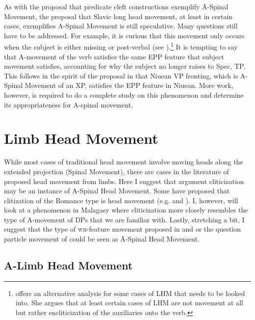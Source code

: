 \documentclass[output=paper,colorlinks,citecolor=brown,
]{langscibook}
\begin{document}
\ea
    \z
\z

As with the proposal that predicate cleft constructions exemplify \=A-Spinal Movement, the proposal that Slavic long head movement, at least in certain cases, exemplifies A-Spinal Movement is still speculative.  Many questions still have to be addressed.  For example, it is curious that this movement only occurs when the subject is either missing or post-verbal (see \citet[322 and fn 1]{Rivero:1994}).\footnote{\citet{King:1996} offers an alternative analysis for some cases of LHM that needs to be looked into.  She argues that at least certain cases of LHM are not movement at all but rather encliticization of the auxiliaries onto the verb.}   It is tempting to say that A-movement of the verb satisfies the same EPP feature that subject movement satisfies, accounting for why the subject no longer raises to Spec, TP.  This follows in the spirit of the proposal in \citet{Massam:2001a} that Niuean VP fronting, which is A-Spinal Movement of an XP, satisfies the EPP feature in Niuean.  More work, however, is required to do a complete study on this phenomenon and determine its appropriateness for A-spinal movement.

\section{Limb Head Movement}

 While most cases of traditional head movement involve moving heads along the extended projection (Spinal Movement), there are cases in the literature of proposed head movement from limbs.  Here I suggest that argument cliticization may be an instance of A-Spinal Head Movement.  Some have proposed that clitization of the Romance type is head movement (e.g. \citet{Roberts:2010} and \citet{Preminger:2019}). I, however, will look at a phenomenon in Malagasy where cliticization more closely resembles the type of A-movement of DPs that we are familiar with.  Lastly, stretching a bit, I suggest that the type of \textsc{wh}-feature movement proposed in \citet{Cheng:2000b} and \citet{Donati:2006} or the question particle movement of \citet{Hagstrom:2000} could be seen as \=A-Spinal Head Movement.

\subsection{A-Limb Head Movement}
\end{document}
